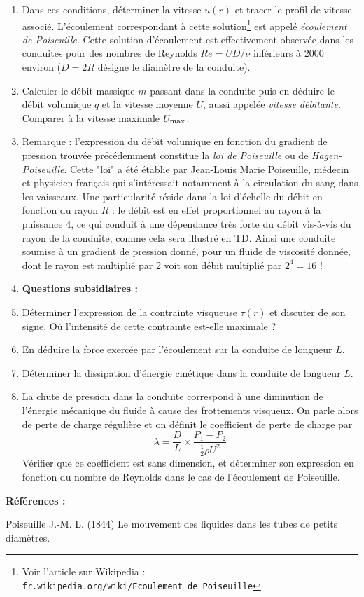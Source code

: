 \documentclass[10pt, a4paper]{article}
\begin{document}
\begin{enumerate}
\item
	Dans ces conditions, déterminer la vitesse $u(r)$ et tracer le profil de vitesse associé.
	L'écoulement correspondant à cette solution\footnote{Voir 
	l'article sur Wikipedia : \texttt{fr.wikipedia.org/wiki/Ecoulement\_de\_Poiseuille}}
  est appelé \textsl{écoulement de Poiseuille}.
	Cette solution d'écoulement est effectivement observée dans les conduites pour des nombres
	de Reynolds $Re=UD/\nu$ inférieurs à 2000 environ ($D=2R$ désigne le diamètre de la conduite). 
\item
	Calculer le débit massique $\dot{m}$ passant dans la conduite
	puis en déduire le débit volumique $q$ et la vitesse moyenne $U$,
	aussi appelée \textsl{vitesse débitante}.
	Comparer à la vitesse maximale $U_{\mbox{\footnotesize max}}$.
\item[]
	Remarque :
	l'expression du débit volumique en fonction du gradient de pression 
	trouvée précé\-demment constitue la \textsl{loi de Poiseuille} ou de \textsl{Hagen-Poiseuille}.
	Cette "loi" a été établie par
	Jean-Louis Marie Poiseuille, médecin et physicien français qui s'intéressait notamment 
	à la circulation du sang dans les vaisseaux.
	Une particularité réside dans la loi d'échelle du débit en fonction du rayon $R$ :
	le débit est en effet proportionnel au rayon à la puissance 4, 
	ce qui conduit à une dépendance très forte du débit
	vis-à-vis du rayon de la conduite, comme cela sera illustré en TD.
	Ainsi une conduite soumise à un gradient de pression donné, pour un fluide de viscosité donnée,
	dont le rayon est multiplié par 2 voit son débit multiplié par $2^4 = 16$ !
\item[]
	\textbf{Questions subsidiaires :}
\item
	Déterminer l'expression de la contrainte visqueuse $\tau(r)$ et discuter de son signe.
	Où l'intensité de cette contrainte est-elle maximale ? 
\item
	En déduire la force exercée par l'écoulement sur la conduite de longueur $L$.
\item
	Déterminer la dissipation d'énergie cinétique dans la conduite de longueur $L$.
\item
	La chute de pression dans la conduite correspond à une diminution de l'énergie mécanique 
	du fluide à cause des frottements visqueux. On parle alors de perte de charge régulière
	et on définit le coefficient de perte de charge par 
	\begin{equation}
		\lambda = \dfrac{D}{L} \times \dfrac{P_1-P_2}{\frac{1}{2} \rho U^2}
	\end{equation}	
	Vérifier que ce coefficient est sans dimension, et déterminer son expression en fonction
	du nombre de Reynolds dans le cas de l'écoulement de Poiseuille. 
\end{enumerate}

\medskip
\noindent
\textbf{Références :}

\medskip
Poiseuille J.-M. L. (1844) Le mouvement des liquides dans les tubes de petits diamètres.

\end{document}
